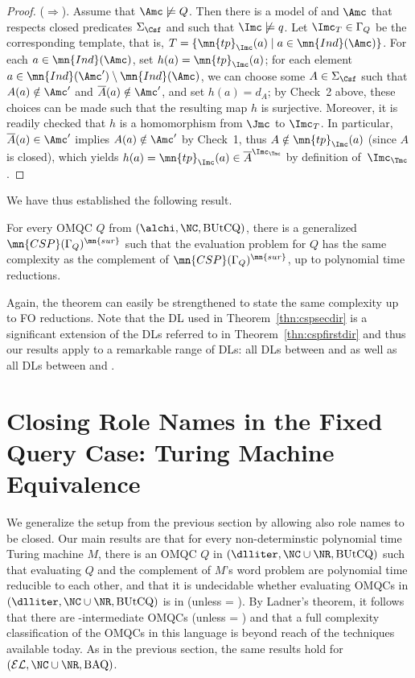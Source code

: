 \documentclass{lmcs}
\theoremstyle{definition}
\begin{document}
\begin{proof}
  \smallskip
  \noindent
  ($\Rightarrow$).  Assume that $\Amc
  \not\models Q$. Then there is a model \Imc of
  \Tmc and $\Amc$ that respects closed predicates $\Sigma_{\Csf}$ and
  such that $\Imc\not\models q$.  Let $\Imc_T \in \Gamma_{Q}$ be the
  corresponding template, that is, $ T = \{ \mn{tp}_\Imc(a) \mid a \in
  \mn{Ind}(\Amc) \}$. For each $a \in \mn{Ind}(\Amc)$, set
  $h(a)=\mn{tp}_\Imc(a)$; for each element $a \in \mn{Ind}(\Amc')
  \setminus \mn{Ind}(\Amc)$, we can choose some $A \in \Sigma_{\Csf}$
  such that $A(a) \notin \Amc'$ and $\overline{A}(a) \notin \Amc'$, and
  set $h(a)=d_A$; by Check~2 above, these choices can be made such
  that the resulting map $h$ is surjective. Moreover, it is readily
  checked that $h$ is a homomorphism from $\Jmc$ to $\Imc_T$.  In
  particular, $\overline{A}(a) \in \Amc'$ implies $A(a) \notin \Amc'$
  by Check~1, thus $A \notin \mn{tp}_\Imc(a)$ (since $A$ is closed),
  which yields $h(a)=\mn{tp}_\Imc(a) \in \overline{A}^{\Imc_\Tmc}$ by
  definition of~$\Imc_\Tmc$.
\end{proof}

We have thus established the following result.
%
\begin{thm}
  \label{thn:cspsecdir}
  For every OMQC $Q$ from $(\alchi,\NC,\text{BUtCQ})$, there
  is a generalized $\mn{CSP}(\Gamma_{Q})^\mn{sur}$ 
  such that the evaluation problem for $Q$ has the same complexity as the complement of
  $\mn{CSP}(\Gamma_{Q})^\mn{sur}$, up to polynomial time reductions.
\end{thm}
%
Again, the theorem can easily be strengthened to state the same
complexity up to FO reductions. Note that the DL \alchi
used in Theorem~\ref{thn:cspsecdir} is a significant extension of the
DLs referred to in Theorem~\ref{thn:cspfirstdir} and thus our results
apply to a remarkable range of DLs: all DLs between
\dllitecore and \alchi as well as all DLs between
\EL and \alchi.

\section{Closing Role Names in the Fixed Query Case: Turing Machine Equivalence}
\label{TMequi}

We generalize the setup from the previous section by allowing also
role names to be closed. Our main results are that for every
non-determinstic polynomial time Turing machine $M$, there is an OMQC
$Q$ in $(\dlliter,\NC \cup \NR,\text{BUtCQ})$ such that evaluating $Q$
and the complement of $M$'s word problem are polynomial time reducible
to each other, and that it is undecidable whether evaluating OMQCs in
$(\dlliter,\NC \cup \NR,\text{BUtCQ})$ is in \ptime (unless \ptime =
\np).  By Ladner's theorem, it follows that there are
\conp-intermediate OMQCs (unless \ptime = \np) and that a full
complexity classification of the OMQCs in this language is beyond
reach of the techniques available today. As in the previous section,
the same results hold for $(\mathcal{EL},\NC\cup \NR,\text{BAQ})$.
\end{document}
